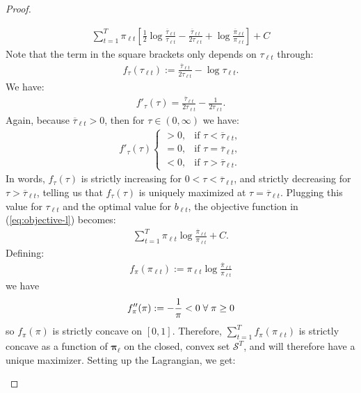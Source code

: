 \begin{proof}
\begin{enumerate}[label=\roman*.]
\begin{align*}
     \sum_{t=1}^T \pi_{\ell t}\left[\frac{1}{2} \log \frac{\overline{\tau}_{\ell t}}{\tau_{\ell t}} - \frac{\overline{\tau}_{\ell t}}{2\tau_{\ell t}} + \log \frac{\overline{\pi}_{\ell t} }{\pi_{\ell t}}\right]+C
\end{align*}
Note that the term in the square brackets only depends on $\tau_{\ell t}$ through:
\begin{align*}
    f_\tau(\tau_{\ell t}) :=  \frac{\overline{\tau}_{\ell t}}{2\tau_{\ell t}} - \log \tau_{\ell t}.
\end{align*}
We have:
\begin{align*}
    f'_\tau(\tau) = \frac{\overline{\tau}_{\ell t}}{2 \tau_{\ell t}} - \frac{1}{2\tau_{\ell t}}.
\end{align*}
Again, because $\overline{\tau}_{\ell t} > 0$, then for $\tau \in (0,\infty)$ we have:
\begin{align*}
    f'_\tau(\tau)
    \begin{cases}
        > 0, & \text{if } \tau < \overline{\tau}_{\ell t}, \\ 
        = 0, & \text{if } \tau = \overline{\tau}_{\ell t}, \\  
        < 0, & \text{if } \tau > \overline{\tau}_{\ell t}.
    \end{cases}
\end{align*}
In words, $f_\tau(\tau)$ is strictly increasing for $0 < \tau < \overline{\tau}_{\ell t}$, and strictly decreasing for $\tau > \overline{\tau}_{\ell t}$, telling us that $f_\tau(\tau)$ is uniquely maximized at $\tau = \overline{\tau}_{\ell t}$. Plugging this value for $\tau_{\ell t}$ and the optimal value for $b_{\ell t}$, the objective function in (\ref{eq:objective-l}) becomes:
\begin{align*}
    \sum_{t=1}^T \pi_{\ell t} \log \frac{\overline{\pi}_{\ell t}}{\pi_{\ell t}} +C.
\end{align*}
Defining:
\begin{align*}
    f_\pi(\pi_{\ell t}):=\pi_{\ell t} \log \frac{\overline{\pi}_{\ell t}}{\pi_{\ell t}}
\end{align*}
we have
\begin{align*}
    f''_\pi(\pi):= -\frac{1}{\pi} < 0 \;\forall\; \pi \geq 0
\end{align*}
so $f_\pi(\pi)$ is strictly concave on $[0,1]$. Therefore, $\sum_{t=1}^T f_\pi(\pi_{\ell t})$ is strictly concave as a function of $\boldsymbol{\pi}_\ell$ on the closed, convex set $\mathcal{S}^T$, and will therefore have a unique maximizer. Setting up the Lagrangian, we get:

\end{enumerate}
\end{proof}

